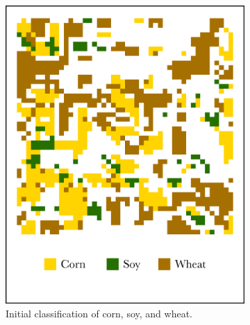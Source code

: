 \begin{figure}
  \centering
  \begin{subfigure}[b]{.45\textwidth}
    \includegraphics[width=\textwidth]{Graphics/classification1_edited.png}
    \caption{Initial classification of corn, soy, and wheat.}
    \begin{minipage}{.1cm} %
      \vfill
    \end{minipage}
    \label{subfig:classification1}
  \end{subfigure}
  \quad
  \begin{subfigure}[b]{.45\textwidth}

\end{subfigure}
\end{figure}
